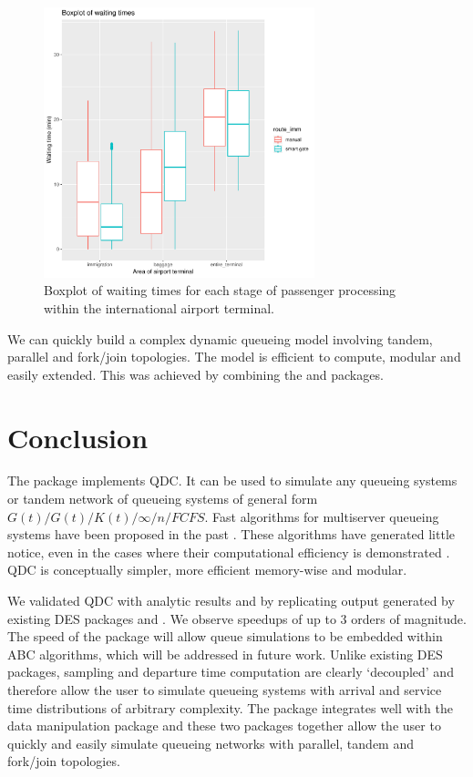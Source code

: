 \documentclass[article]{jss}
\begin{document}
\begin{figure}[!htb]
\centering
\includegraphics[width = 0.7\textwidth]{figures/boxplot_dplyr.pdf}
\caption{Boxplot of waiting times for each stage of passenger processing within the international airport terminal. }
\label{fig:boxplot_dplyr.pdf}
\end{figure}

We can quickly build a complex dynamic queueing model involving tandem, parallel and fork/join topologies. The model is efficient to compute, modular and easily extended. This was achieved by combining the  and  packages. 

\section{Conclusion}

The  package  implements QDC. It can be used to simulate any queueing systems or tandem network of queueing systems of general form $G(t)/G(t)/K(t)/\infty/n/FCFS$. Fast algorithms for multiserver queueing systems have been proposed in the past \citep{krivulin_recursive_1994,sutton_inference_2010,kin_generalized_2010}. These algorithms have generated little notice, even in the cases where their computational efficiency is demonstrated \citep{kin_generalized_2010}. QDC is conceptually simpler, more efficient memory-wise and modular. 

We validated QDC with analytic results and by replicating output generated by existing DES packages  and . We observe speedups of up to 3 orders of magnitude. The speed of the package will allow queue simulations to be embedded within ABC algorithms, which will be addressed in future work. Unlike existing DES packages, sampling and departure time computation are clearly `decoupled' and therefore allow the user to simulate queueing systems with arrival and service time distributions of arbitrary complexity. The package integrates well with the data manipulation package  and these two packages together allow the user to quickly and easily simulate queueing networks with parallel, tandem and fork/join topologies. 
\end{document}
